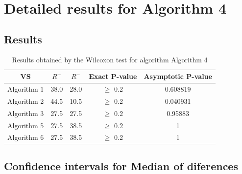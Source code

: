 \documentclass[a4paper,10pt]{article}
\begin{document}
 \clearpage 


\section{Detailed results for Algorithm 4}


\subsection{Results}

\begin{table}[!htp]
\centering\small
\begin{tabular}{
|c|c|c|c|c|}
\hline
 VS & $R^{+}$ & $R^{-}$ & Exact P-value & Asymptotic P-value \\ \hline 
Algorithm 1 & 38.0 & 28.0 & $\geq$ 0.2 & 0.608819\\ \hline 
Algorithm 2 & 44.5 & 10.5 & $\geq$ 0.2 & 0.040931\\ \hline 
Algorithm 3 & 27.5 & 27.5 & $\geq$ 0.2 & 0.95883\\ \hline 
Algorithm 5 & 27.5 & 38.5 & $\geq$ 0.2 & 1\\ \hline 
Algorithm 6 & 27.5 & 38.5 & $\geq$ 0.2 & 1\\ \hline 

\end{tabular}
\caption{Results obtained by the Wilcoxon test for algorithm Algorithm 4}
\end{table}

\subsection{Confidence intervals for Median of diferences}
\end{document}
